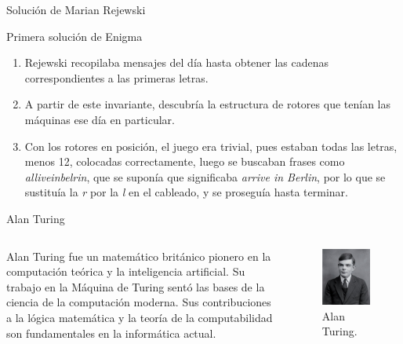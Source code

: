 \documentclass[aspectratio=169]{beamer}
\begin{document}
\begin{frame}{Solución de Marian Rejewski}
\begin{block}{Primera solución de Enigma}
    \begin{enumerate}
         \pause \item Rejewski recopilaba mensajes del día hasta obtener las cadenas correspondientes a las primeras letras.
         \pause \item A partir de este invariante, descubría la estructura de rotores que tenían las máquinas ese día en particular.
         \pause \item Con los rotores en posición, el juego era trivial, pues estaban todas las letras, menos 12, colocadas correctamente, luego se buscaban frases como \textit{alliveinbelrin}, que se suponía que significaba \textit{arrive in Berlin}, por lo que se sustituía la \textit{r} por la \textit{l} en el cableado, y se proseguía hasta terminar.
    \end{enumerate}
\end{block}

\end{frame}

\begin{frame}{Alan Turing}

\begin{columns}
    \begin{column}{0.5\textwidth}
Alan Turing fue un matemático británico pionero en la computación teórica y la inteligencia artificial. Su trabajo en la Máquina de Turing sentó las bases de la ciencia de la computación moderna. Sus contribuciones a la lógica matemática y la teoría de la computabilidad son fundamentales en la informática actual.
        
    \end{column}
    \begin{column}{0.5\textwidth}
        \begin{figure}
            \centering
    \includegraphics[width=0.65\linewidth]{pic/Alan Turing.png}
            \caption{Alan Turing.}
        \end{figure}
    \end{column}
\end{columns}
\end{frame}
\end{document}
